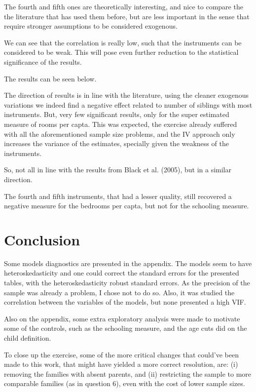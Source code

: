 \documentclass[12pt]{article}
\begin{document}
The fourth and fifth ones are theoretically interesting, and nice to compare the the literature that has used them before, but are less important in the sense that require stronger assumptions to be considered exogenous.

We can see that the correlation is really low, such that the instruments can be considered to be weak. This will pose even further reduction to the statistical significance of the results.

The results can be seen below.




The direction of results is in line with the literature, using the cleaner exogenous variations we indeed find a negative effect related to number of siblings with most instruments. But, very few significant results, only for the super estimated measure of rooms per capta. This was expected, the exercise already suffered with all the aforementioned sample size problems, and the IV approach only increases the variance of the estimates, specially given the weakness of the instruments.

So, not all in line with the results from Black et al. (2005), but in a similar direction.

The fourth and fifth instruments, that had a lesser quality, still recovered a negative measure for the bedrooms per capta, but not for the schooling measure.


\section*{Conclusion}
Some models diagnostics are presented in the appendix. The models seem to have heteroskedasticity and one could correct the standard errors for the presented tables, with the heteroskedasticity robust standard errors. As the precision of the sample was already a problem, I chose not to do so. Also, it was studied the correlation between the variables of the models, but none presented a high VIF.

Also on the appendix, some extra exploratory analysis were made to motivate some of the controls, such as the schooling measure, and the age cuts did on the child definition.

To close up the exercise, some of the more critical changes that could've been made to this work, that might have yielded a more correct resolution, are: (i) removing the families with absent parents, and (ii) restricting the sample to more comparable families (as in question 6), even with the cost of lower sample sizes.
\end{document}
